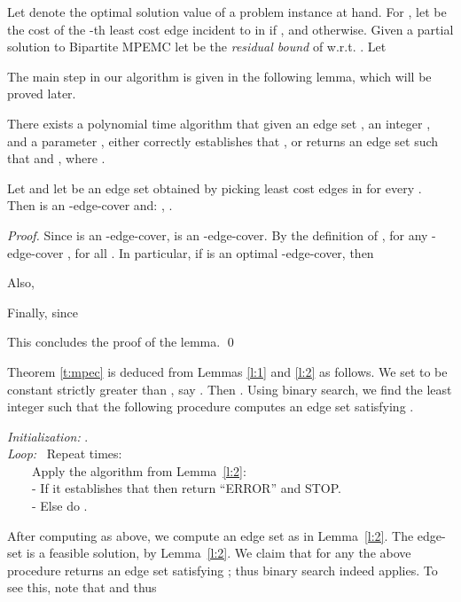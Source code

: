 \documentclass{llncs}
\begin{document}
Let  denote the optimal solution value of a problem instance at hand.
For , let  be the cost of the -th least cost edge incident to  
in  if , and  otherwise.
Given a partial solution  to {\sf Bipartite MPEMC} let 
 be the {\em residual bound} of  w.r.t. .
Let 


The main step in our algorithm is given in the following lemma, 
which will be proved later.
 
\begin{lemma} \label{l:1}
There exists a polynomial time algorithm that given an edge set , 
an integer , and a parameter , either correctly establishes that 
, or  
returns an edge set  such that 
 and , where
. 
\end{lemma}

\begin{lemma} \label{l:2}
Let  and let  be an edge set obtained by picking 
 least cost edges in  for every . 
Then  is an -edge-cover and: ,
. 
\end{lemma}
\begin{proof}
Since  is an -edge-cover,  is an -edge-cover.
By the definition of , for any -edge-cover ,
 for all .
In particular, if  is an optimal -edge-cover, then 

Also, 

Finally,  since

This concludes the proof of the lemma.
\qed
\end{proof}

Theorem \ref{t:mpec} is deduced from Lemmas \ref{l:1} and \ref{l:2} as follows.
We set  to be constant strictly greater than , say .
Then .
Using binary search, we find the least integer  such that the following procedure 
computes an edge set  satisfying .  

\vspace{0.2cm}

\noindent
{\em Initialization:} . \\
{\em Loop:} \ Repeat  times: \\
\hphantom{Loop:} \ \ \ \ Apply the algorithm from Lemma~\ref{l:2}: \\ 
\hphantom{Loop:} \ \ \ \ - If it establishes that  then return ``ERROR'' and STOP. \\
\hphantom{Loop:} \ \ \ \ - Else do . 

\vspace{0.2cm}

After computing  as above, we compute an edge set  as in Lemma~\ref{l:2}.
The edge-set  is a feasible solution, by Lemma~\ref{l:2}.
We claim that for any  the above procedure returns an edge 
set  satisfying ; thus binary search indeed applies.
To see this, note that  and thus
\end{document}
